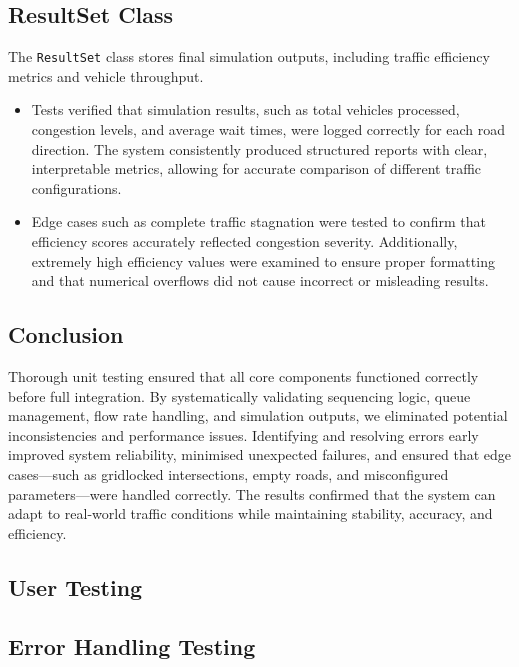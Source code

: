\documentclass{article}
\begin{document}
\subsection*{ResultSet Class}
The \texttt{ResultSet} class stores final simulation outputs, including traffic efficiency metrics and vehicle throughput.  
\begin{itemize}
    \item Tests verified that simulation results, such as total vehicles processed, congestion levels, and average wait times, were logged correctly for each road direction. The system consistently produced structured reports with clear, interpretable metrics, allowing for accurate comparison of different traffic configurations.
    \item Edge cases such as complete traffic stagnation were tested to confirm that efficiency scores accurately reflected congestion severity. Additionally, extremely high efficiency values were examined to ensure proper formatting and that numerical overflows did not cause incorrect or misleading results.
\end{itemize}

\subsection*{Conclusion}
Thorough unit testing ensured that all core components functioned correctly before full integration. By systematically validating sequencing logic, queue management, flow rate handling, and simulation outputs, we eliminated potential inconsistencies and performance issues. Identifying and resolving errors early improved system reliability, minimised unexpected failures, and ensured that edge cases—such as gridlocked intersections, empty roads, and misconfigured parameters—were handled correctly. The results confirmed that the system can adapt to real-world traffic conditions while maintaining stability, accuracy, and efficiency.

    \subsection{User Testing}

    \subsection{Error Handling Testing}
\end{document}

